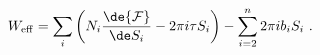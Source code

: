 \begin{equation}
  \label{eq:Weff2}
  W_{\rm eff}= 
\sum_i \left( N_i \frac{\de {\cal F}}{\de S_i} - 2\pi i\tau S_i\right ) 
- \sum_{i=2}^n 2\pi i b_i S_i\ .
\end{equation}

